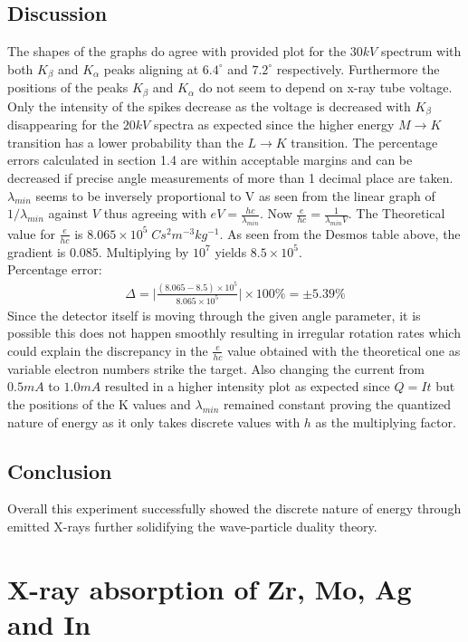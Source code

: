 \documentclass{article}
\begin{document}
\subsection{Discussion}
The shapes of the graphs do agree with provided plot for the $30kV$ spectrum with both $K_{\beta}$ and $K_{\alpha}$ peaks aligning at $6.4^{\circ}$ and $7.2^{\circ}$ respectively. Furthermore the positions of 
the peaks $K_{\beta}$ and $K_{\alpha}$ do not seem to depend on x-ray tube voltage. Only the intensity of the spikes decrease as the voltage is decreased with $K_{\beta}$ disappearing for the $20kV$ spectra as expected since the higher energy $M\to K$ transition has a lower probability than the $L\to K$ transition. The percentage errors calculated in section 1.4 are within acceptable margins and can be decreased if precise angle measurements of more than 1 decimal place are taken. $\lambda_{min}$ seems to be inversely proportional to V as seen from the linear graph of $1/\lambda_{min}$ against $V$ thus agreeing with $eV=\frac{hc}{\lambda_{min}}$. Now $\frac{e}{hc}=\frac{1}{\lambda_{min} V}$. The Theoretical value for $\frac{e}{hc}$ is $8.065\times 10^5\; Cs^2m^{-3}kg^{-1}$. As seen from the Desmos table above, the gradient is 0.085. Multiplying by $10^7$ yields $8.5\times 10^5$.\\
Percentage error:
\begin{align*}
    \Delta=\Bigg|\frac{(8.065-8.5)\times 10^5}{8.065\times 10^5}\Bigg|\times 100\%=\pm 5.39\%
\end{align*}
Since the detector itself is moving through the given angle parameter, it is possible this does not happen smoothly resulting in irregular rotation rates which could explain the discrepancy in the $\frac{e}{hc}$ value obtained with the theoretical one as variable electron numbers strike the target. Also changing the current from $0.5mA$ to $1.0mA$ resulted in a higher intensity plot as expected since $Q=It$ but the positions of the K values and $\lambda_{min}$ remained constant proving the quantized nature of energy as it only takes discrete values with $h$ as the multiplying factor.
\subsection{Conclusion}
Overall this experiment successfully showed the discrete nature of energy through emitted X-rays further solidifying the wave-particle duality theory.  
\newpage
\section{X-ray absorption of Zr, Mo, Ag and In}
\end{document}
